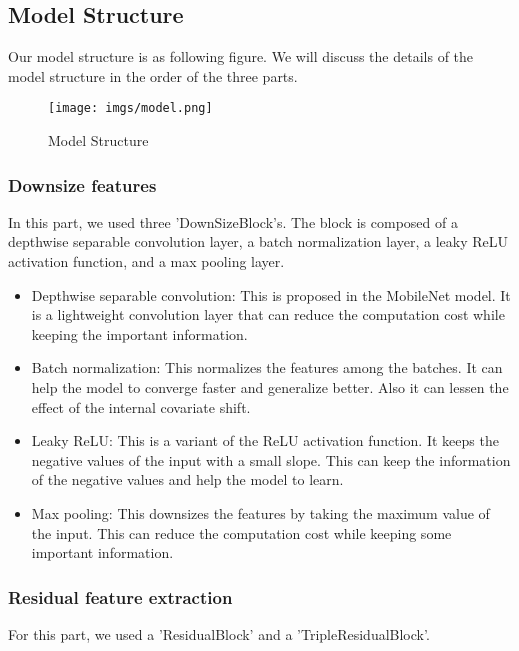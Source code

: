 \documentclass[12pt]{article}
\begin{document}
\subsection{Model Structure}

Our model structure is as following figure. We will discuss the details of the model structure in the order of the three parts.

\begin{figure}[h]
    \centering
    \texttt{[image: imgs/model.png]}
    \caption{Model Structure}
\end{figure}

\subsubsection{Downsize features}

In this part, we used three 'DownSizeBlock's. The block is composed of a depthwise separable convolution layer, a batch normalization layer, a leaky ReLU activation function, and a max pooling layer. 

\begin{itemize}
    \item Depthwise separable convolution: This is proposed in the MobileNet model. It is a lightweight convolution layer that can reduce the computation cost while keeping the important information.
    \item Batch normalization: This normalizes the features among the batches. It can help the model to converge faster and generalize better. Also it can lessen the effect of the internal covariate shift.
    \item Leaky ReLU: This is a variant of the ReLU activation function. It keeps the negative values of the input with a small slope. This can keep the information of the negative values and help the model to learn.
    \item Max pooling: This downsizes the features by taking the maximum value of the input. This can reduce the computation cost while keeping some important information.
\end{itemize}

\subsubsection{Residual feature extraction}

For this part, we used a 'ResidualBlock' and a 'TripleResidualBlock'.
\end{document}
